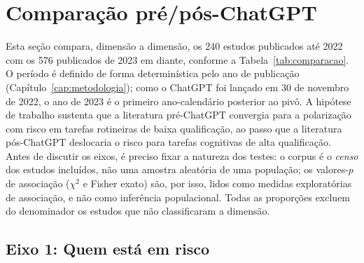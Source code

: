 \section{Comparação pré/pós-ChatGPT}\label{cap:comparacao}

Esta seção compara, dimensão a dimensão, os 240 estudos publicados até 2022 com os 576 publicados de 2023 em diante, conforme a Tabela~\ref{tab:comparacao}. O período é definido de forma determinística pelo ano de publicação (Capítulo~\ref{cap:metodologia}); como o ChatGPT foi lançado em 30 de novembro de 2022, o ano de 2023 é o primeiro ano-calendário posterior ao pivô. A hipótese de trabalho sustenta que a literatura pré-ChatGPT convergia para a polarização com risco em tarefas rotineiras de baixa qualificação, ao passo que a literatura pós-ChatGPT deslocaria o risco para tarefas cognitivas de alta qualificação. Antes de discutir os eixos, é preciso fixar a natureza dos testes: o corpus é o \emph{censo} dos estudos incluídos, não uma amostra aleatória de uma população; os valores-$p$ de associação ($\chi^2$ e Fisher exato) são, por isso, lidos como medidas exploratórias de associação, e não como inferência populacional. Todas as proporções excluem do denominador os estudos que não classificaram a dimensão.

\begin{table}[htbp]
\centering
\caption{Comparação pareada de dimensões pré e pós-ChatGPT.}
\label{tab:comparacao}

\end{table}

\subsection{Eixo 1: Quem está em risco}

